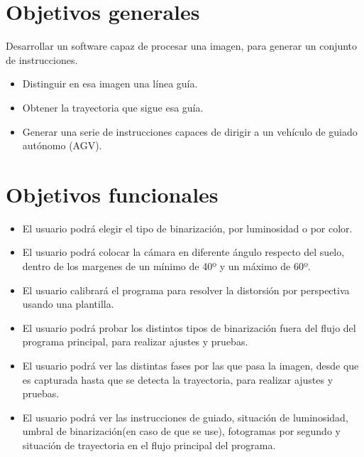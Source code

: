 
\section{Objetivos generales}
Desarrollar un software capaz de procesar una imagen, para generar un conjunto de instrucciones.

\begin{itemize}
	\item Distinguir en esa imagen una línea guía.
	
	\item Obtener la trayectoria que sigue esa guía.
	
	\item Generar una serie de instrucciones capaces de dirigir a un vehículo de guiado autónomo (AGV).
\end{itemize} 

\section{Objetivos funcionales}
\begin{itemize}
	\item El usuario podrá elegir el tipo de binarización, por luminosidad o por color.
	
	\item El usuario podrá colocar la cámara en diferente ángulo respecto del suelo, dentro de los margenes de un mínimo de 40º y un máximo de 60º.
	
	\item El usuario calibrará el programa para resolver la distorsión por perspectiva usando una plantilla.
	
	\item El usuario podrá probar los distintos tipos de binarización fuera del flujo del programa principal, para realizar ajustes y pruebas.
	
	\item El usuario podrá ver las distintas fases por las que pasa la imagen, desde que es capturada hasta que se detecta la trayectoria, para realizar ajustes y pruebas.
	
	\item El usuario podrá ver las instrucciones de guiado, situación de luminosidad, umbral de binarización(en caso de que se use), fotogramas por segundo y situación de trayectoria en el flujo principal del programa.
	
\end{itemize}


